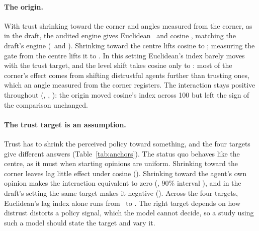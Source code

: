 \documentclass[11pt]{article}
\begin{document}
\paragraph{The origin.}
With trust shrinking toward the corner and angles measured from the corner, as in the draft, the audited engine gives Euclidean \VTUnitRawCornerEucIdx\ and cosine \VTUnitRawCornerCosIdx, matching the draft's engine (\VCDraftFixedEucIdx\ and \VCDraftFixedCosIdx).
Shrinking toward the centre lifts cosine to \VTUnitRawCentreCosIdx; measuring the gate from the centre lifts it to \VTCentredRawCornerCosIdx.
In this setting Euclidean's index barely moves with the trust target, and the level shift takes cosine only to \VTUnitRawLevelShiftCosIdx: most of the corner's effect comes from shifting distrustful agents further than trusting ones, which an angle measured from the corner registers.
The interaction stays positive throughout (\VTUnitRawCornerInter, \VTUnitRawCentreInter, \VTUnitRawLevelShiftInter): the origin moved cosine's index across 100 but left the sign of the comparison unchanged.

\begin{table}[t]
\centering\small
\caption{Trust targets in the recommended design: lag index per geometry (95\% CI), relative shock effect at lags 0 and 40 for Euclidean (E) and cosine (C), and the paired interaction; $^{=}$ marks equivalence to zero.}
\label{tab:anchors}

\end{table}

\paragraph{The trust target is an assumption.}
Trust has to shrink the perceived policy toward something, and the four targets give different answers (Table~\ref{tab:anchors}).
The status quo behaves like the centre, as it must when starting opinions are uniform.
Shrinking toward the corner leaves lag little effect under cosine (\VTCentredRunCornerCosIdx).
Shrinking toward the agent's own opinion makes the interaction equivalent to zero (\VTCentredRunOwnInter, 90\% interval \VTCentredRunOwnCINinety), and in the draft's setting the same target makes it negative (\VTUnitRawOwnInter).
Across the four targets, Euclidean's lag index alone runs from \VTargetEucMin\ to \VTargetEucMax.
The right target depends on how distrust distorts a policy signal, which the model cannot decide, so a study using such a model should state the target and vary it.
\end{document}
